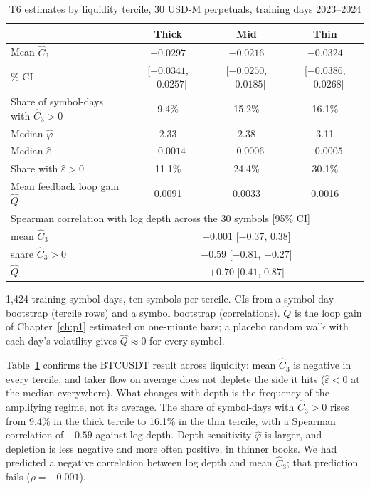 \begin{table}[t]\centering
\begin{threeparttable}
\caption{T6 estimates by liquidity tercile, 30 USD-M perpetuals, training days 2023--2024}\label{p2:tab:x3}
\small\setlength{\tabcolsep}{5pt}
\begin{tabular}{lccc}
\toprule
 & Thick & Mid & Thin\\
\midrule
Mean $\hat C_3$ & $-0.0297$ & $-0.0216$ & $-0.0324$\\
\quad 95\% CI & [$-0.0341$, $-0.0257$] & [$-0.0250$, $-0.0185$] & [$-0.0386$, $-0.0268$]\\
Share of symbol-days with $\hat C_3>0$ & 9.4\% & 15.2\% & 16.1\%\\
Median $\hat\varphi$ & 2.33 & 2.38 & 3.11\\
Median $\hat\varepsilon$ & $-0.0014$ & $-0.0006$ & $-0.0005$\\
Share with $\hat\varepsilon>0$ & 11.1\% & 24.4\% & 30.1\%\\
Mean feedback loop gain $\hat Q$ & 0.0091 & 0.0033 & 0.0016\\
\midrule
\multicolumn{4}{l}{Spearman correlation with log depth across the 30 symbols [95\% CI]}\\
\quad mean $\hat C_3$ & \multicolumn{3}{c}{$-0.001$ [$-0.37$, $0.38$]}\\
\quad share $\hat C_3>0$ & \multicolumn{3}{c}{$-0.59$ [$-0.81$, $-0.27$]}\\
\quad $\hat Q$ & \multicolumn{3}{c}{$+0.70$ [$0.41$, $0.87$]}\\
\bottomrule
\end{tabular}
\begin{tablenotes}\footnotesize\item 1{,}424 training symbol-days, ten symbols per tercile. CIs from a symbol-day bootstrap (tercile rows) and a symbol bootstrap (correlations). $\hat Q$ is the loop gain of Chapter~\ref{ch:p1} estimated on one-minute bars; a placebo random walk with each day's volatility gives $\hat Q\approx0$ for every symbol. \end{tablenotes}
\end{threeparttable}
\end{table}

Table~\ref{p2:tab:x3} confirms the BTCUSDT result across liquidity: mean $\hat C_3$ is negative in every tercile, and taker flow on average does not deplete the side it hits ($\hat\varepsilon<0$ at the median everywhere). What changes with depth is the frequency of the amplifying regime, not its average. The share of symbol-days with $\hat C_3>0$ rises from 9.4\% in the thick tercile to 16.1\% in the thin tercile, with a Spearman correlation of $-0.59$ against log depth. Depth sensitivity $\hat\varphi$ is larger, and depletion is less negative and more often positive, in thinner books. We had predicted a negative correlation between log depth and mean $\hat C_3$; that prediction fails ($\rho=-0.001$).

